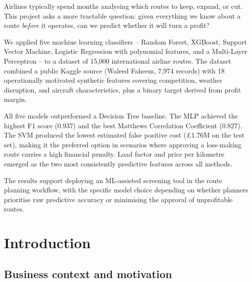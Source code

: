 \documentclass[12pt,a4paper]{article}
\begin{document}
Airlines typically spend months analysing which routes to keep, expand, or cut. This project asks a more tractable question: given everything we know about a route \emph{before} it operates, can we predict whether it will turn a profit?

We applied five machine learning classifiers -- Random Forest, XGBoost, Support Vector Machine, Logistic Regression with polynomial features, and a Multi-Layer Perceptron -- to a dataset of 15,000 international airline routes. The dataset combined a public Kaggle source (Waleed Faheem, 7,974 records) with 18 operationally motivated synthetic features covering competition, weather disruption, and aircraft characteristics, plus a binary target derived from profit margin.

All five models outperformed a Decision Tree baseline. The MLP achieved the highest F1 score (0.937) and the best Matthews Correlation Coefficient (0.827). The SVM produced the lowest estimated false positive cost (£1.76M on the test set), making it the preferred option in scenarios where approving a loss-making route carries a high financial penalty. Load factor and price per kilometre emerged as the two most consistently predictive features across all methods.

The results support deploying an ML-assisted screening tool in the route planning workflow, with the specific model choice depending on whether planners prioritise raw predictive accuracy or minimising the approval of unprofitable routes.

\newpage
\tableofcontents
\newpage
\listoffigures
\listoftables

\newpage
{}

\section{Introduction}
\label{sec:intro}

\subsection{Business context and motivation}
\label{subsec:context}
\end{document}
